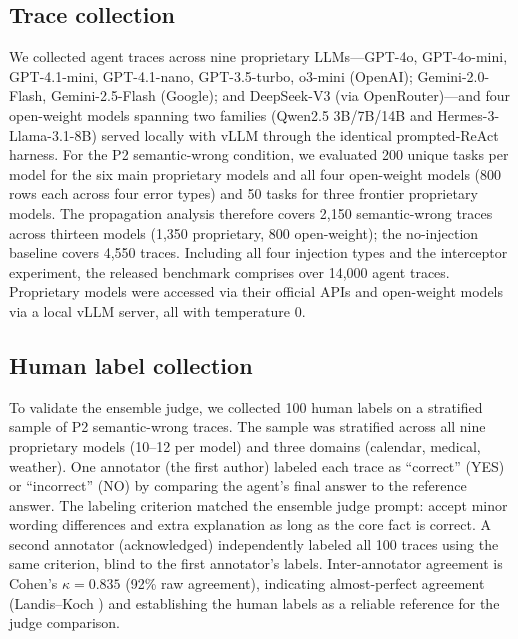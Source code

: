 \documentclass{ieeeaccess}
\begin{document}
\subsection{Trace collection}

We collected agent traces across nine proprietary LLMs---GPT-4o, GPT-4o-mini,
GPT-4.1-mini, GPT-4.1-nano, GPT-3.5-turbo, o3-mini (OpenAI); Gemini-2.0-Flash,
Gemini-2.5-Flash (Google); and DeepSeek-V3 (via OpenRouter)---and four
open-weight models spanning two families (Qwen2.5 3B/7B/14B and
Hermes-3-Llama-3.1-8B) served locally with vLLM through the identical
prompted-ReAct harness.
For the P2 semantic-wrong condition, we evaluated 200 unique tasks per model for
the six main proprietary models and all four open-weight models (800 rows each
across four error types) and 50 tasks for three frontier proprietary models. The
propagation analysis therefore covers 2{,}150 semantic-wrong traces across
thirteen models (1{,}350 proprietary, 800 open-weight); the no-injection
baseline covers 4{,}550 traces. Including all four injection types and the
interceptor experiment, the released benchmark comprises over 14{,}000 agent
traces.
Proprietary models were accessed via their official APIs and open-weight models
via a local vLLM server, all with temperature 0.

\subsection{Human label collection}

To validate the ensemble judge, we collected 100 human labels on a
stratified sample of P2 semantic-wrong traces.
The sample was stratified across all nine proprietary models (10--12 per model)
and three domains (calendar, medical, weather).
One annotator (the first author) labeled each trace as ``correct''
(YES) or ``incorrect'' (NO) by comparing the agent's final answer to
the reference answer.
The labeling criterion matched the ensemble judge prompt: accept minor
wording differences and extra explanation as long as the core fact is
correct.
A second annotator (acknowledged) independently labeled all 100 traces using
the same criterion, blind to the first annotator's labels. Inter-annotator
agreement is Cohen's $\kappa{=}0.835$ (92\% raw agreement), indicating
almost-perfect agreement (Landis--Koch \cite{landis1977kappa}) and establishing
the human labels as a reliable reference for the judge comparison.
\end{document}
